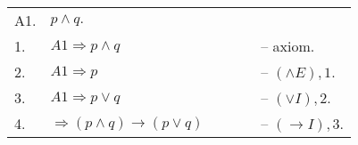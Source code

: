 \begin{table}[h]
\begin{center}
\begin{tabular}{llll}
A1. & $p \wedge q.$               & $\qquad$ & \\
1.  & $A1 \Rightarrow p \wedge q$ & $\qquad$ & -- axiom. \\
2.  & $A1 \Rightarrow p$          & $\qquad$ & -- $(\wedge E), 1$. \\
3.  & $A1 \Rightarrow p \vee   q$ & $\qquad$ & -- $(\vee I), 2$.   \\
4.  & $\Rightarrow (p \wedge q) \rightarrow (p \vee q)$ & $\qquad$ & -- $(\rightarrow I), 3.$   
\end{tabular}
\end{center}
\end{table}


